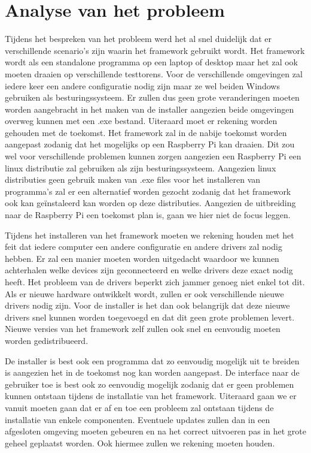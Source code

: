 \documentclass{article}
\begin{document}
\section{Analyse van het probleem} \label{section:analyse}
Tijdens het bespreken van het probleem werd het al snel duidelijk dat er verschillende scenario's zijn waarin het framework gebruikt wordt. 
Het framework wordt als een standalone programma op een laptop of desktop maar het zal ook moeten draaien op verschillende testtorens. 
Voor de verschillende omgevingen zal iedere keer een andere configuratie nodig zijn maar ze wel beiden Windows gebruiken als besturingssysteem. 
Er zullen dus geen grote veranderingen moeten worden aangebracht in het maken van de installer aangezien beide omgevingen overweg kunnen met een .exe bestand. 
Uiteraard moet er rekening worden gehouden met de toekomst. 
Het framework zal in de nabije toekomst worden aangepast zodanig dat het mogelijks op een Raspberry Pi kan draaien.
Dit zou wel voor verschillende problemen kunnen zorgen aangezien een Raspberry Pi een linux distributie zal gebruiken als zijn besturingssysteem.
Aangezien linux distributies geen gebruik maken van .exe files voor het installeren van programma's zal er een alternatief worden gezocht zodanig dat het framework ook kan ge\"instaleerd kan worden op deze distributies.
Aangezien de uitbreiding naar de Raspberry Pi een toekomst plan is, gaan we hier niet de focus leggen.

Tijdens het installeren van het framework moeten we rekening houden met het feit dat iedere computer een andere configuratie en andere drivers zal nodig hebben.
Er zal een manier moeten worden uitgedacht waardoor we kunnen achterhalen welke devices zijn geconnecteerd en welke drivers deze exact nodig heeft.
Het probleem van de drivers beperkt zich jammer genoeg niet enkel tot dit.
Als er nieuwe hardware ontwikkelt wordt, zullen er ook verschillende nieuwe drivers nodig zijn. 
Voor de installer is het dan ook belangrijk dat deze nieuwe drivers snel kunnen worden toegevoegd en dat dit geen grote problemen levert.
Nieuwe versies van het framework zelf zullen ook snel en eenvoudig moeten worden gedistribueerd.

De installer is best ook een programma dat zo eenvoudig mogelijk uit te breiden is aangezien het in de toekomst nog kan worden aangepast. 
De interface naar de gebruiker toe is best ook zo eenvoudig mogelijk zodanig dat er geen problemen kunnen ontstaan tijdens de installatie van het framework.
Uiteraard gaan we er vanuit moeten gaan dat er af en toe een probleem zal ontstaan tijdens de installatie van enkele componenten.
Eventuele updates zullen dan in een afgesloten omgeving moeten gebeuren en na het correct uitvoeren pas in het grote geheel geplaatst worden.
Ook hiermee zullen we rekening moeten houden.
\end{document}
